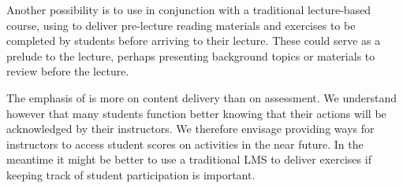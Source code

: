 \documentclass{ximera}
\begin{document}
Another possibility is to use  in
conjunction with a traditional lecture-based course, using
 to deliver pre-lecture
reading materials and exercises to be completed by students before
arriving to their lecture.  These could serve as a prelude to the
lecture, perhaps presenting background topics or materials to review
before the lecture.

The emphasis of 
is more on content delivery than on assessment.
We understand however that many students function
better knowing that their actions will be acknowledged by
their instructors. We therefore envisage providing ways
for instructors to access student scores on 
 activities
in the near future. In the meantime it might
be better to use a traditional LMS to deliver exercises
if keeping track of student participation is important.
\end{document}
